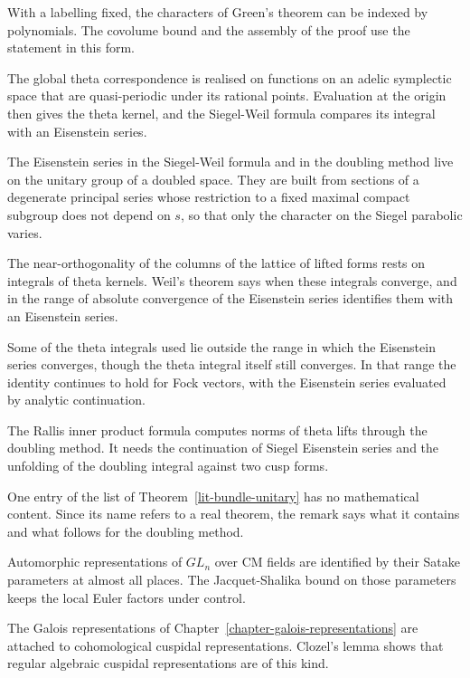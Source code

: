 With a labelling fixed, the characters of Green's theorem can be indexed by
polynomials. The covolume bound and the assembly of the proof use the
statement in this form.

The global theta correspondence is realised on functions on an adelic
symplectic space that are quasi-periodic under its rational points. Evaluation
at the origin then gives the theta kernel, and the Siegel-Weil formula
compares its integral with an Eisenstein series.

The Eisenstein series in the Siegel-Weil formula and in the doubling method
live on the unitary group of a doubled space. They are built from sections of
a degenerate principal series whose restriction to a fixed maximal compact
subgroup does not depend on $s$, so that only the character on the Siegel
parabolic varies.

The near-orthogonality of the columns of the lattice of lifted forms rests on
integrals of theta kernels. Weil's theorem says when these integrals converge,
and in the range of absolute convergence of the Eisenstein series identifies
them with an Eisenstein series.

Some of the theta integrals used lie outside the range in which the Eisenstein
series converges, though the theta integral itself still converges. In that
range the identity continues to hold for Fock vectors, with the Eisenstein
series evaluated by analytic continuation.

The Rallis inner product formula computes norms of theta lifts through the
doubling method. It needs the continuation of Siegel Eisenstein series and
the unfolding of the doubling integral against two cusp forms.

One entry of the list of Theorem~\ref{lit-bundle-unitary} has no
mathematical content. Since its name refers to a real theorem, the remark says
what it contains and what follows for the doubling method.

Automorphic representations of $GL_n$ over CM fields are identified by their
Satake parameters at almost all places. The Jacquet-Shalika bound on those
parameters keeps the local Euler factors under control.

The Galois representations of Chapter~\ref{chapter-galois-representations}
are attached to cohomological cuspidal representations. Clozel's lemma shows
that regular algebraic cuspidal representations are of this kind.

